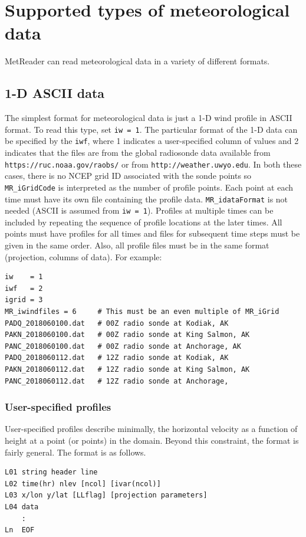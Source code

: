 \documentclass[11pt]{article}   %
\begin{document}
\section{Supported types of meteorological data}
MetReader can read meteorological data in a variety of different formats.  
\subsection{1-D ASCII data}
The simplest format for meteorological data is just a 1-D wind profile in ASCII
format.  To read this type, set \texttt{iw = 1}.  The particular format
of the 1-D data can be specified by the \texttt{iwf}, where 1 indicates a
user-specified column of values and 2 indicates that the files are from 
the global radiosonde data available from \texttt{https://ruc.noaa.gov/raobs/} or
from \texttt{http://weather.uwyo.edu}.
In both these cases, there is no NCEP grid ID associated with the sonde points so
\texttt{MR\_iGridCode} is interpreted as the number of profile points.  Each point at each
time must have its own file containing the profile data.
\texttt{MR\_idataFormat} is not needed (ASCII is assumed from \texttt{iw = 1}).
Profiles at multiple times can be included by repeating the sequence of profile
locations at the later times.  All points must have profiles for all times and files
for subsequent time steps must be given in the same order.
Also, all profile files must be in the same format (projection, columns of data).
For example:

\small
\begin{verbatim}
iw    = 1
iwf   = 2
igrid = 3
MR_iwindfiles = 6     # This must be an even multiple of MR_iGrid
PADQ_2018060100.dat   # 00Z radio sonde at Kodiak, AK
PAKN_2018060100.dat   # 00Z radio sonde at King Salmon, AK
PANC_2018060100.dat   # 00Z radio sonde at Anchorage, AK
PADQ_2018060112.dat   # 12Z radio sonde at Kodiak, AK
PAKN_2018060112.dat   # 12Z radio sonde at King Salmon, AK
PANC_2018060112.dat   # 12Z radio sonde at Anchorage, 
\end{verbatim}
\normalsize

\subsubsection{User-specified profiles}
User-specified profiles describe minimally, the horizontal velocity as a function
of height at a point (or points) in the domain.  Beyond this constraint,
the format is fairly
general.  The format is as follows.
\small
\begin{verbatim}
L01 string header line
L02 time(hr) nlev [ncol] [ivar(ncol)]
L03 x/lon y/lat [LLflag] [projection parameters]
L04 data
    :
Ln  EOF
\end{verbatim}
\normalsize
\end{document}
